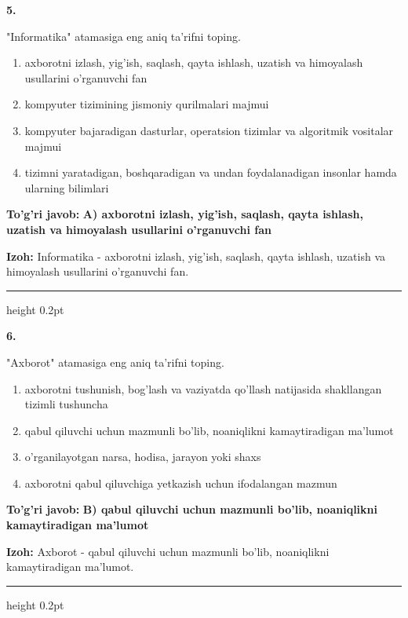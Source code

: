 \documentclass[10pt,a4paper,oneside]{article}
\begin{document}
\noindent\textbf{\color{ink}5.}
\par
"Informatika" atamasiga eng aniq ta'rifni toping.
\begin{enumerate}[label=\Alph*),leftmargin=9mm]
\item axborotni izlash, yig'ish, saqlash, qayta ishlash, uzatish va himoyalash usullarini o'rganuvchi fan
\item kompyuter tizimining jismoniy qurilmalari majmui
\item kompyuter bajaradigan dasturlar, operatsion tizimlar va algoritmik vositalar majmui
\item tizimni yaratadigan, boshqaradigan va undan foydalanadigan insonlar hamda ularning bilimlari
\end{enumerate}
\begin{tcolorbox}[enhanced,breakable,colback=teal!4,colframe=teal!50!black,boxrule=0.5pt,arc=1.1mm,left=3mm,right=3mm,top=1.7mm,bottom=1.7mm,before skip=2mm,after skip=2mm]
\textbf{\color{teal}To'g'ri javob:} \textbf{A) axborotni izlash, yig'ish, saqlash, qayta ishlash, uzatish va himoyalash usullarini o'rganuvchi fan}
\par\smallskip
\textbf{Izoh:} Informatika - axborotni izlash, yig'ish, saqlash, qayta ishlash, uzatish va himoyalash usullarini o'rganuvchi fan.
\end{tcolorbox}
\vspace{2mm}\hrule height 0.2pt \vspace{3mm}

\noindent\textbf{\color{ink}6.}
\par
"Axborot" atamasiga eng aniq ta'rifni toping.
\begin{enumerate}[label=\Alph*),leftmargin=9mm]
\item axborotni tushunish, bog'lash va vaziyatda qo'llash natijasida shakllangan tizimli tushuncha
\item qabul qiluvchi uchun mazmunli bo'lib, noaniqlikni kamaytiradigan ma'lumot
\item o'rganilayotgan narsa, hodisa, jarayon yoki shaxs
\item axborotni qabul qiluvchiga yetkazish uchun ifodalangan mazmun
\end{enumerate}
\begin{tcolorbox}[enhanced,breakable,colback=teal!4,colframe=teal!50!black,boxrule=0.5pt,arc=1.1mm,left=3mm,right=3mm,top=1.7mm,bottom=1.7mm,before skip=2mm,after skip=2mm]
\textbf{\color{teal}To'g'ri javob:} \textbf{B) qabul qiluvchi uchun mazmunli bo'lib, noaniqlikni kamaytiradigan ma'lumot}
\par\smallskip
\textbf{Izoh:} Axborot - qabul qiluvchi uchun mazmunli bo'lib, noaniqlikni kamaytiradigan ma'lumot.
\end{tcolorbox}
\vspace{2mm}\hrule height 0.2pt \vspace{3mm}
\end{document}
